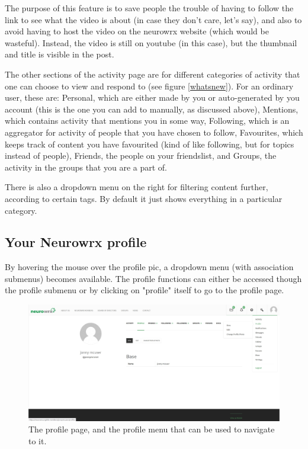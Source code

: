 \documentclass[10pt]{article}
\begin{document}
\begin{flushleft}
The purpose of this feature is to save people the trouble of having to follow the link to see what the video is about (in case they don't care, let's say), and also to avoid having to host the video on the neurowrx website (which would be wasteful).  Instead, the video is still on youtube (in this case), but the thumbnail and title is visible in the post.  
\end{flushleft}

\begin{flushleft}
The other sections of the activity page are for different categories of activity that one can choose to view and respond to (see figure \ref{whatsnew}).  For an ordinary user, these are: Personal, which are either made by you or auto-generated by you account (this is the one you can add to manually, as discussed above), Mentions, which contains activity that mentions you in some way, Following, which is an aggregator for activity of people that you have chosen to follow, Favourites, which keeps track of content you have favourited (kind of like following, but for topics instead of people), Friends, the people on your friendslist, and Groups, the activity in the groups that you are a part of.  
\end{flushleft}

\begin{flushleft}
There is also a dropdown menu on the right for filtering content further, according to certain tags.  By default it just shows everything in a particular category.  
\end{flushleft}


\subsection{Your Neurowrx profile}

\begin{flushleft}
By hovering the mouse over the profile pic, a dropdown menu (with association submenus) becomes available.  The profile functions can either be accessed though the profile submenu or by clicking on "profile" itself to go to the profile page.  
\end{flushleft}

\begin{figure}[H]
    \centering
    \includegraphics[scale=0.2]{images/profile.jpg}
    \caption{The profile page, and the profile menu that can be used to navigate to it.}
    \label{profilepage}
\end{figure}
\end{document}

